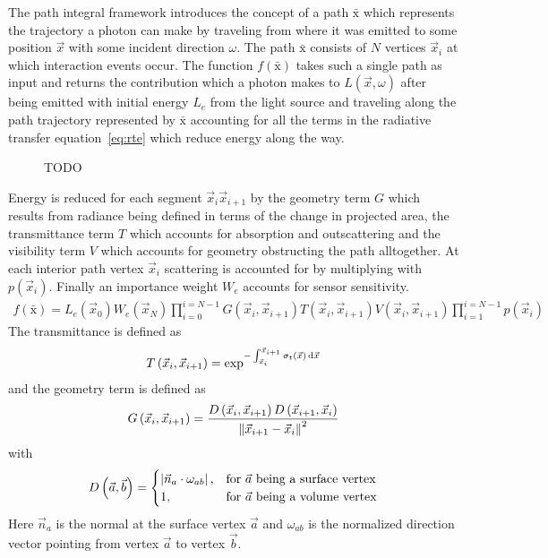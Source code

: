 The path integral framework introduces the concept of a path $\bar{\mathrm{x}}$ which represents the trajectory a photon can make by traveling from where it was emitted to some position $\vec{x}$ with some incident direction $\omega$. The path $\bar{\mathrm{x}}$ consists of $N$ vertices $\vec{x}_i$ at which interaction events occur. The function $f\left(\bar{\mathrm{x}}\right)$ takes such a single path as input and returns the contribution which a photon makes to $L(\vec{x}, \omega)$ after being emitted with initial energy $L_e$ from the light source and traveling along the path trajectory represented by $\bar{\mathrm{x}}$ accounting for all the terms in the radiative transfer equation~\ref{eq:rte} which reduce energy along the way.
\begin{figure}[t]
\centering
{}
\caption{TODO}
\label{fig:mc_path_sample_contributions}
\end{figure}

Energy is reduced for each segment $\vec{x}_i \vec{x}_{i+1}$ by the geometry term $G$ which results from radiance being defined in terms of the change in projected area, the transmittance term $T$ which accounts for absorption and outscattering and the visibility term $V$ which accounts for geometry obstructing the path alltogether. At each interior path vertex $\vec{x}_i$ scattering is accounted for by multiplying with $p(\vec{x}_i)$. Finally an importance weight $W_e$ accounts for sensor sensitivity.
\begin{align}
f\left(\bar{\mathrm{x}}\right) =
L_e\left(\vec{x}_0\right)
W_e\left(\vec{x}_N\right)
\prod_{i=0}^{i=N-1}
G\left(\vec{x}_i, \vec{x}_{i+1}\right)
T\left(\vec{x}_i, \vec{x}_{i+1}\right)
V\left(\vec{x}_i, \vec{x}_{i+1}\right)
\prod_{i=1}^{i=N-1}
p\left(\vec{x}_i\right)
\label{eq:foundations_mc_pathintegral}
\end{align}
The transmittance is defined as
\begin{align}
T\left(\vec{x}_i, \vec{x}_{i+1}\right) =
\operatorname{exp}^
{
    -\int_{\vec{x}_i}^{\vec{x}_{i+1}}\sigma_t\left(\vec{x}\right)\,\mathrm{d}\vec{x}
}
\end{align}
and the geometry term is defined as
\begin{align}
G\left(\vec{x}_i, \vec{x}_{i+1}\right) =
\frac{D\left(\vec{x}_{i}, \vec{x}_{i+1}\right)D\left(\vec{x}_{i+1}, \vec{x}_{i}\right)}{\left\lVert\vec{x}_{i+1}-\vec{x}_{i}\right\rVert^2}
\end{align}
with
\begin{align}
D\left(\vec{a}, \vec{b}\right) =
\begin{cases}
\left\vert\vec{n}_a\cdot\omega_{ab}\right\vert, & \text{for $\vec{a}$ being a surface vertex}
\\
1, & \text{for $\vec{a}$ being a volume vertex}
\end{cases}
\end{align}
Here $\vec{n}_a$ is the normal at the surface vertex $\vec{a}$ and $\omega_{ab}$ is the normalized direction vector pointing from vertex $\vec{a}$ to vertex $\vec{b}$.

